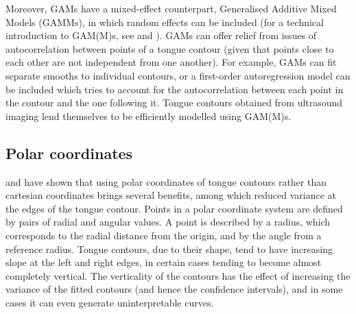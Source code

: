 \documentclass[11pt,]{article}
\begin{document}
Moreover, GAMs have a mixed-effect counterpart, Generalised Additive
Mixed Models (GAMMs), in which random effects can be included (for a
technical introduction to GAM(M)s, see \citealt{zuur2012} and
\citealt{wood2017}). GAMs can offer relief from issues of
autocorrelation between points of a tongue contour (given that points
close to each other are not independent from one another). For example,
GAMs can fit separate smooths to individual contours, or a first-order
autoregression model can be included which tries to account for the
autocorrelation between each point in the contour and the one following
it. Tongue contours obtained from ultrasound imaging lend themselves to
be efficiently modelled using GAM(M)s.

\hypertarget{polar-coordinates}{%
\subsection{Polar coordinates}\label{polar-coordinates}}

\citet{mielke2015} and \citet{heyne2015a, heyne2015} have shown that
using polar coordinates of tongue contours rather than cartesian
coordinates brings several benefits, among which reduced variance at the
edges of the tongue contour. Points in a polar coordinate system are
defined by pairs of radial and angular values. A point is described by a
radius, which corresponds to the radial distance from the origin, and by
the angle from a reference radius. Tongue contours, due to their shape,
tend to have increasing slope at the left and right edges, in certain
cases tending to become almost completely vertical. The verticality of
the contours has the effect of increasing the variance of the fitted
contours (and hence the confidence intervals), and in some cases it can
even generate uninterpretable curves.
\end{document}

